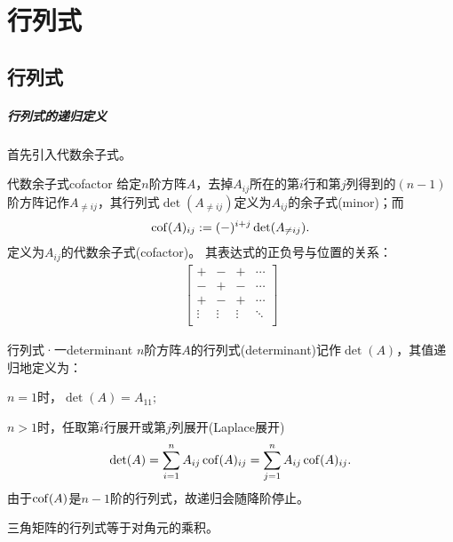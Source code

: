 \chapter{行列式}

\section{行列式}

\paragraph{行列式的递归定义}

首先引入代数余子式。

\begin{definition}{代数余子式}{cofactor}
	给定$n$阶方阵$A$，去掉$A_{ij}$所在的第$i$行和第$j$列得到的$(n-1)$阶方阵记作$A_{\neq ij}$，其行列式$\det(A_{\neq ij})$定义为$A_{ij}$的余子式(minor)；而
	\begin{align}
		\operatorname{cof}(A)_{ij}:=(-)^{i+j}\det(A_{\neq ij}).
	\end{align}
	定义为$A_{ij}$的代数余子式(cofactor)。
	其表达式的正负号与位置的关系：
	\begin{align}
		\begin{bmatrix}
			+&-&+&\cdots\\
			-&+&-&\cdots\\
			+&-&+&\cdots\\
			\vdots&\vdots&\vdots&\ddots\\
		\end{bmatrix}
	\end{align}
\end{definition}
\begin{definition}{行列式·一}{determinant}
	$n$阶方阵$A$的行列式(determinant)记作$\det(A)$，其值递归地定义为：
	\begin{compactenum}
		\item $n=1$时，$\det(A)=A_{11};$
		\item $n>1$时，任取第$i$行展开或第$j$列展开(Laplace展开)
		\begin{align}
			\det(A) = \sum_{i=1}^nA_{ij}\operatorname{cof}(A)_{ij} = \sum_{j=1}^nA_{ij}\operatorname{cof}(A)_{ij}.
		\end{align}
		由于$\operatorname{cof}(A)$是$n-1$阶的行列式，故递归会随降阶停止。
	\end{compactenum}
\end{definition}

\begin{corollary}
	三角矩阵的行列式等于对角元的乘积。
\end{corollary}

